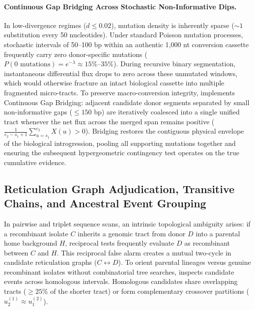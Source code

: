 \paragraph{Continuous Gap Bridging Across Stochastic Non-Informative Dips.}
In low-divergence regimes ($d \le 0.02$), mutation density is inherently sparse ($\sim 1$ substitution every 50 nucleotides).
Under standard Poisson mutation processes, stochastic intervals of 50--100 bp within an authentic 1,000 nt conversion cassette frequently carry zero donor-specific mutations ($P(0 \text{ mutations}) = e^{-\lambda} \approx 15\%\text{--}35\%$).
During recursive binary segmentation, instantaneous differential flux drops to zero across these unmutated windows, which would otherwise fracture an intact biological cassette into multiple fragmented micro-tracts.
To preserve macro-conversion integrity, \RhizAeon implements Continuous Gap Bridging:
adjacent candidate donor segments separated by small non-informative gaps ($\le 150$ bp) are iteratively coalesced into a single unified tract whenever the net flux across the merged span remains positive ($\frac{1}{e_2 - s_1 + 1} \sum_{u=s_1}^{e_2} X(u) > 0$).
Bridging restores the contiguous physical envelope of the biological introgression, pooling all supporting mutations together and ensuring the subsequent hypergeometric contingency test operates on the true cumulative evidence.

\subsection{Reticulation Graph Adjudication, Transitive Chains, and Ancestral Event Grouping}
\label{subsec:methods_adjudication_grouping}

In pairwise and triplet sequence scans, an intrinsic topological ambiguity arises: if a recombinant isolate $C$ inherits a genomic tract from donor $D$ into a parental home background $H$, reciprocal tests frequently evaluate $D$ as recombinant between $C$ and $H$.
This reciprocal false alarm creates a mutual two-cycle in candidate reticulation graphs ($C \leftrightarrow D$).
To orient parental lineages versus genuine recombinant isolates without combinatorial tree searches, \RhizAeon inspects candidate events across homologous intervals.
Homologous candidates share overlapping tracts ($\ge 25\%$ of the shorter tract) or form complementary crossover partitions ($u_2^{(1)} \approx u_1^{(2)}$).

